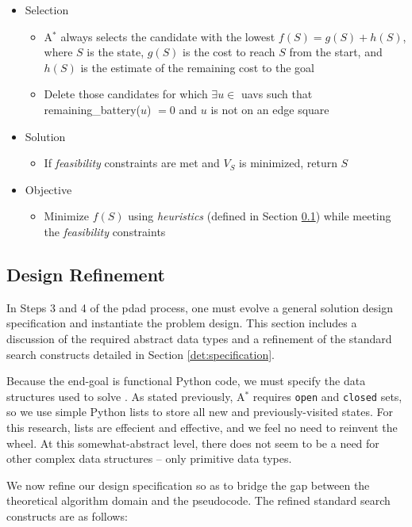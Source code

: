 \documentclass[../main.tex]{subfiles}
\begin{document}
\begin{itemize}
    \item Selection
    \begin{itemize}
        \item A$^*$ always selects the candidate with the lowest $f(S)=g(S)+h(S)$, where $S$ is the state, $g(S)$ is the cost to reach $S$ from the start, and $h(S)$ is the estimate of the remaining cost to the goal
        \item Delete those candidates for which $\exists u\in$ \acp{uav} such that remaining\_battery($u$) $=0$ and $u$ is not on an edge square
    \end{itemize}

    \item Solution
    \begin{itemize}
        \item If \textit{feasibility} constraints are met and $V_S$ is minimized, return $S$
    \end{itemize}

    \item Objective
    \begin{itemize}
        \item Minimize $f(S)$ using \textit{heuristics} (defined in Section \ref{det:refinement}) while meeting the \textit{feasibility} constraints
    \end{itemize}
\end{itemize}

\subsection{Design Refinement}\label{det:refinement}

In Steps 3 and 4 of the \ac{pdad} process, one must evolve a general solution design specification and instantiate the problem design. This section includes a discussion of the required abstract data types and a refinement of the standard search constructs detailed in Section \ref{det:specification}.

Because the end-goal is functional Python code, we must specify the data structures used to solve \prob. As stated previously, A$^*$ requires \texttt{open} and \texttt{closed} sets, so we use simple Python lists to store all new and previously-visited states. For this research, lists are effecient and effective, and we feel no need to reinvent the wheel. At this somewhat-abstract level, there does not seem to be a need for other complex data structures -- only primitive data types.

We now refine our design specification so as to bridge the gap between the theoretical algorithm domain and the pseudocode. The refined standard search constructs are as follows:
\end{document}

